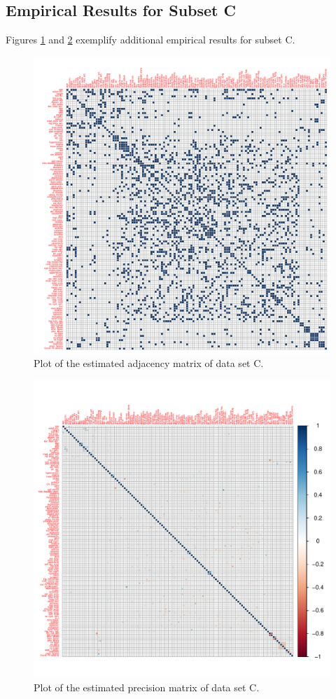 \subsection*{Empirical Results for Subset C}

Figures \ref{fig:corrplot_admat_C} and \ref{fig:corrplot_omega_C} exemplify additional empirical results for subset C.

\begin{figure}[ht]
    \centering
    \includegraphics[width=1.0\textwidth]{Figures/corrplot_admat_C.pdf}
    \caption{Plot of the estimated adjacency matrix of data set C.}
    \label{fig:corrplot_admat_C}
\end{figure}

\begin{figure}
    \centering
    \includegraphics[width=1.0\textwidth]{Figures/corrplot_omega_C.pdf}
    \caption{Plot of the estimated precision matrix of data set C.}
    \label{fig:corrplot_omega_C}
\end{figure}
